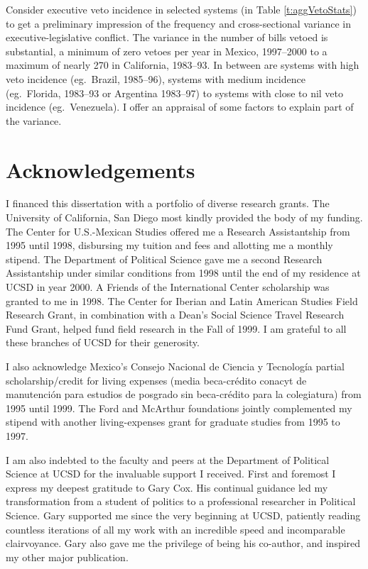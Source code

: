 Consider executive veto incidence in selected systems (in Table \ref{t:aggVetoStats}) to get a preliminary impression of the frequency and cross-sectional variance in executive-legislative conflict.  The variance in the number of bills vetoed is substantial, a minimum of zero vetoes per year in Mexico, 1997--2000 to a maximum of nearly 270 in California, 1983--93.  In between are systems with high veto incidence (eg.\ Brazil, 1985--96), systems with medium incidence (eg.\ Florida, 1983--93 or Argentina 1983--97) to systems with close to nil veto incidence (eg.\ Venezuela).  I offer an appraisal of some factors to explain part of the variance.                                      
                  
\chapter{Acknowledgements}

I financed this dissertation with a portfolio of diverse research grants.  The University of California, San Diego most kindly provided the body of my funding.  The Center for U.S.-Mexican Studies offered me a Research Assistantship from 1995 until 1998, disbursing my tuition and fees and allotting me a monthly stipend.  The Department of Political Science gave me a second Research Assistantship under similar conditions from 1998 until the end of my residence at UCSD in year 2000.  A Friends of the International Center scholarship was granted to me in 1998.  The Center for Iberian and Latin American Studies Field Research Grant, in combination with a Dean's Social Science Travel Research Fund Grant, helped fund field research in the Fall of 1999.  I am grateful to all these branches of UCSD for their generosity.  

I also acknowledge Mexico's Consejo Nacional de Ciencia y Tecnología partial scholarship/credit for living expenses (media beca-crédito conacyt de manutención para estudios de posgrado sin beca-crédito para la colegiatura) from 1995 until 1999.  The Ford and McArthur foundations jointly complemented my stipend with another living-expenses grant for graduate studies from 1995 to 1997.  

I am also indebted to the faculty and peers at the Department of Political Science at UCSD for the invaluable support I received.  First and foremost I express my deepest gratitude to Gary Cox.  His continual guidance led my transformation from a student of politics to a professional researcher in Political Science.  Gary supported me since the very beginning at UCSD, patiently reading countless iterations of all my work with an incredible speed and incomparable clairvoyance.  Gary also gave me the privilege of being his co-author, and inspired my other major publication.  

